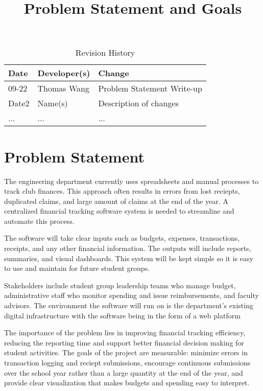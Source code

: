 \documentclass{article}
\title{Problem Statement and Goals\\\progname}
\author{\authname}
\date{}
\begin{document}
\maketitle

\begin{table}[hp]
\caption{Revision History} \label{TblRevisionHistory}
\begin{tabularx}{\textwidth}{llX}
\toprule
\textbf{Date} & \textbf{Developer(s)} & \textbf{Change}\\
\midrule
09-22 & Thomas Wang & Problem Statement Write-up\\
Date2 & Name(s) & Description of changes\\
... & ... & ...\\
\bottomrule
\end{tabularx}
\end{table}

\section{Problem Statement}

The engineering department currently uses spreadsheets and manual processes to track club finances. This approach
often results in errors from lost reciepts, duplicated claims, and large amount of claims at the end of the year. A centralized
financial tracking software system is needed to streamline and automate this process.

The software will take clear inputs such as budgets, expenses, transactions, receipts, and any other financial
information. The outputs will include reports, summaries, and visual dashboards. This system will be kept simple
so it is easy to use and maintain for future student groups.

Stakeholders include student group leadership teams who manage budget, administrative staff who monitor spending and 
issue reimbursements, and faculty advisors. The environment the software will run on is the department's existing digital 
infrastructure with the software being in the form of a web platform

The importance of the problem lies in improving financial tracking efficiency, reducing the reporting time
and support better financial decision making for student activities. The goals of the project are measurable: minimize
errors in transaction logging and reciept submissions, encourage continuous submissions over the school year rather than 
a large quantity at the end of the year, and provide clear visualization that makes budgets and spending easy to interpret.
\end{document}
